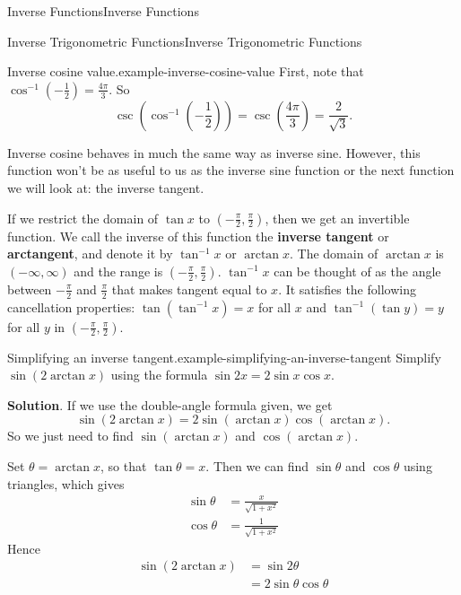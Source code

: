 \documentclass[10pt,]{book}
\newcommand{\terminology}[1]{\textbf{#1}}
\numberwithin{equation}{section}
\begin{document}
\begin{chapterptx}{Inverse Functions}{}{Inverse Functions}{}{}
\begin{sectionptx}{Inverse Trigonometric Functions}{}{Inverse Trigonometric Functions}{}{}
\begin{example}{Inverse cosine value.}{example-inverse-cosine-value}
\hypertarget{p-270}{}%
First, note that \(\cos^{-1}(-\frac{1}{2}) = \frac{4\pi}{3}\). So%
\begin{equation*}
\csc(\cos^{-1}(-\frac{1}{2})) = \csc(\frac{4\pi}{3}) = \frac{2}{\sqrt{3}}.
\end{equation*}
%
\end{example}
\hypertarget{p-271}{}%
Inverse cosine behaves in much the same way as inverse sine. However, this function won't be as useful to us as the inverse sine function or the next function we will look at: the inverse tangent.%
\par
\hypertarget{p-272}{}%
If we restrict the domain of \(\tan x\) to \((-\frac{\pi}{2}, \frac{\pi}{2})\), then we get an  invertible function. We call the inverse of this function the \terminology{inverse tangent} or \terminology{arctangent}, and denote it by \(\tan^{-1}x\) or \(\arctan x\). The domain of \(\arctan x\) is \((-\infty,\infty)\) and the range is \((-\frac{\pi}{2},\frac{\pi}{2})\). \(\tan^{-1}x\) can be thought of as the angle between \(-\frac{\pi}{2}\) and \(\frac{\pi}{2}\) that makes tangent equal to \(x\). It satisfies the following cancellation properties: \(\tan(\tan^{-1}x) = x\) for all \(x\) and \(\tan^{-1}(\tan y) = y\) for all \(y\) in \((-\frac{\pi}{2},\frac{\pi}{2})\).%
\begin{example}{Simplifying an inverse tangent.}{example-simplifying-an-inverse-tangent}%
\hypertarget{p-273}{}%
Simplify \(\sin(2\arctan x)\) using the formula \(\sin2x = 2\sin x\cos x\).%
\par\smallskip%
\noindent\textbf{Solution}.\hypertarget{solution-59}{}\quad%
\hypertarget{p-274}{}%
If we use the double-angle formula given, we get%
\begin{equation*}
\sin(2\arctan x) = 2\sin(\arctan x)\cos(\arctan x).
\end{equation*}
So we just need to find \(\sin(\arctan x)\) and \(\cos(\arctan x)\).%
\par
\hypertarget{p-275}{}%
Set \(\theta = \arctan x\), so that \(\tan\theta = x\). Then we can find \(\sin\theta\) and \(\cos\theta\) using triangles, which gives%
\begin{align*}
\sin\theta & = \frac{x}{\sqrt{1+x^{2}}} \\
\cos\theta & = \frac{1}{\sqrt{1+x^{2}}} 
\end{align*}
Hence%
\begin{align*}
\sin(2\arctan x) & = \sin2\theta \\
& = 2\sin\theta\cos\theta \\

\end{align*}
\end{example}
\end{sectionptx}
\end{chapterptx}
\end{document}
